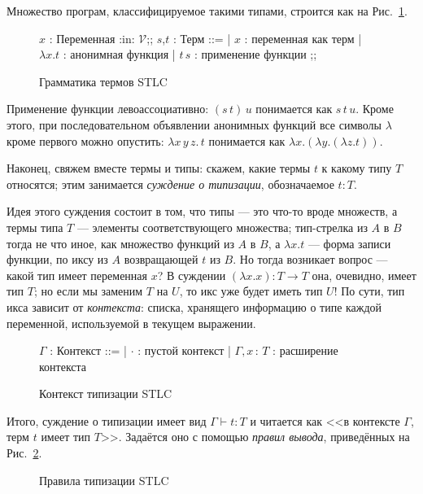 Множество програм, классифицируемое такими типами,
строится как на Рис.~\ref{stlc-terms-grammar}.

\begin{figure}[ht]
    \centering
    \begin{bnf}
        $x$ : \textsf{Переменная} :in: $\mathcal{V}$;;
        $s$,$t$ : \textsf{Терм} ::=
        | $x$ : переменная как терм
        | $\lambda x.t$ : анонимная функция
        | $t\,s$ : применение функции
        ;;
    \end{bnf}
    \caption{Грамматика термов STLC}
    \label{stlc-terms-grammar}
\end{figure}

Применение функции левоассоциативно: $(s\,t)\,u$
понимается как $s\,t\,u$. Кроме этого, при
последовательном объявлении анонимных функций все
символы $\lambda$ кроме первого можно опустить:
$\lambda x\,y\,z.\,t$ понимается как
$\lambda x.(\lambda y.(\lambda z.t))$.

Наконец, свяжем вместе термы и типы: скажем, какие
термы $t$ к какому типу $T$ относятся; этим занимается
\emph{суждение о типизации}, обозначаемое $t:T$.

Идея этого суждения состоит в том, что типы --- это
что-то вроде множеств, а термы типа $T$ --- элементы
соответствующего множества; тип-стрелка из $A$ в $B$
тогда не что иное, как множество функций из $A$ в $B$, а
$\lambda x.t$ --- форма записи функции, по иксу из $A$
возвращающей $t$ из $B$. Но тогда возникает вопрос ---
какой тип имеет переменная $x$? В суждении
$(\lambda x.x):T\to T$ она, очевидно, имеет тип $T$; но
если мы заменим $T$ на $U$, то икс уже будет иметь тип
$U$! По сути, тип икса зависит от \emph{контекста}:
списка, хранящего информацию о типе каждой переменной,
используемой в текущем выражении.

\begin{figure}[ht]
    \centering
    \begin{bnf}
        $\Gamma$ : \textsf{Контекст} ::=
        | $\cdot$ : пустой контекст
        | $\Gamma,x\,\colon\,T$ : расширение контекста
    \end{bnf}
    \caption{Контекст типизации STLC}
\end{figure}

Итого, суждение о типизации имеет вид $\Gamma\vdash t:T$
и читается как <<в контексте $\Gamma$, терм $t$ имеет
тип $T$>>. Задаётся оно с помощью \emph{правил вывода},
приведённых на Рис.~\ref{stlc-typing}.

\begin{figure}[ht]
    \caption{Правила типизации STLC}
    \label{stlc-typing}
\end{figure}

